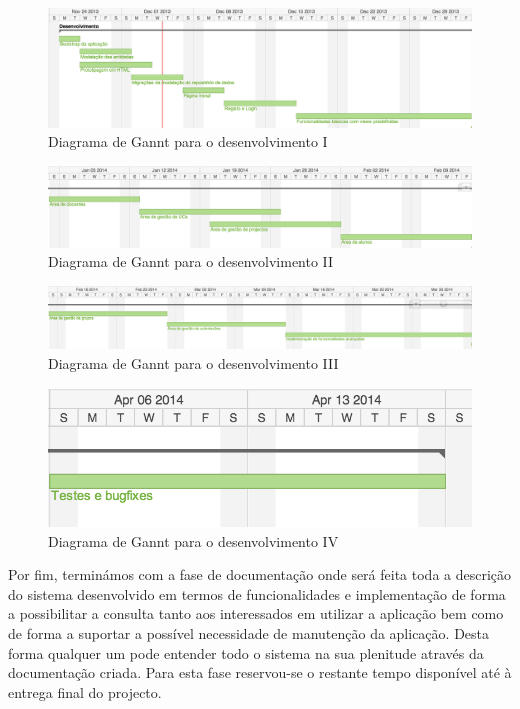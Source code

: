\begin{figure}[htbp] 
	\centering
	\includegraphics[width=1\textwidth]{images/plano_trabalho_2.png}
 	\caption{Diagrama de Gannt para o desenvolvimento I}
 	\label{fig: workplan2}
\end{figure}

\begin{figure}[htbp] 
	\centering
	\includegraphics[width=1\textwidth]{images/plano_trabalho_3.png}
 	\caption{Diagrama de Gannt para o desenvolvimento II}
 	\label{fig: workplan3}
\end{figure}

\begin{figure}[htbp] 
	\centering
	\includegraphics[width=1\textwidth]{images/plano_trabalho_4.png}
 	\caption{Diagrama de Gannt para o desenvolvimento III}
 	\label{fig: workplan4}
\end{figure}

\begin{figure}[htbp!] 
	\centering
	\includegraphics[width=1\textwidth]{images/plano_trabalho_5.png}
 	\caption{Diagrama de Gannt para o desenvolvimento IV}
 	\label{fig: workplan5}
\end{figure}


Por fim, terminámos com a fase de documentação onde será feita toda a descrição 
do sistema desenvolvido em termos de funcionalidades e implementação de forma a 
possibilitar a consulta tanto aos interessados em utilizar a aplicação bem como 
de forma a suportar a possível necessidade de manutenção da aplicação. Desta 
forma qualquer um pode entender todo o sistema na sua plenitude através da 
documentação criada. Para esta fase reservou-se o restante tempo disponível até 
à entrega final do projecto.

